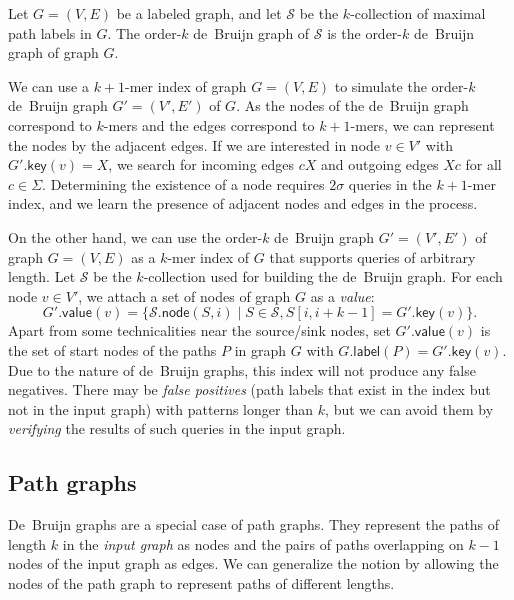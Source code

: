 \documentclass[a4paper,UKenglish]{lipics-v2016}
\newcommand{\set}[1]{\ensuremath{\{ #1 \}}}
\newcommand{\glabel}{\ensuremath{\mathsf{label}}}
\newcommand{\gkey}{\ensuremath{\mathsf{key}}}
\newcommand{\gvalue}{\ensuremath{\mathsf{value}}}
\newcommand{\gnode}{\ensuremath{\mathsf{node}}}
\newcommand{\kmer}[1]{$#1$\nobreakdash-mer}
\newcommand{\kcollection}[1]{$#1$\nobreakdash-collection}
\newcommand{\orderk}[1]{order\nobreakdash-$#1$}
\begin{document}
\begin{definition}
Let $G = (V, E)$ be a labeled graph, and let $\mathcal{S}$ be the \kcollection{k} of maximal path labels in $G$. The \orderk{k} de~Bruijn graph of $\mathcal{S}$ is the \orderk{k} de~Bruijn graph of graph $G$.
\end{definition}

We can use a \kmer{k+1} index of graph $G = (V, E)$ to simulate the \orderk{k} de~Bruijn graph $G' = (V', E')$ of $G$. As the nodes of the de~Bruijn graph correspond to \kmer{k}s and the edges correspond to \kmer{k+1}s, we can represent the nodes by the adjacent edges. If we are interested in node $v \in V'$ with $G'.\gkey(v) = X$, we search for incoming edges $cX$ and outgoing edges $Xc$ for all $c \in \Sigma$. Determining the existence of a node requires $2 \sigma$ queries in the \kmer{k+1} index, and we learn the presence of adjacent nodes and edges in the process.

On the other hand, we can use the \orderk{k} de~Bruijn graph $G' = (V', E')$ of graph $G = (V, E)$ as a \kmer{k} index of $G$ that supports queries of arbitrary length. Let $\mathcal{S}$ be the \kcollection{k} used for building the de~Bruijn graph. For each node $v \in V'$, we attach a set of nodes of graph $G$ as a \emph{value}:
$$
G'.\gvalue(v) = \set{ \mathcal{S}.\gnode(S, i) \mid S \in \mathcal{S}, S[i, i+k-1] = G'.\gkey(v)}.
$$
Apart from some technicalities near the source/sink nodes, set $G'.\gvalue(v)$ is the set of start nodes of the paths $P$ in graph $G$ with $G.\glabel(P) = G'.\gkey(v)$. Due to the nature of de~Bruijn graphs, this index will not produce any false negatives. There may be \emph{false positives} (path labels that exist in the index but not in the input graph) with patterns longer than $k$, but we can avoid them by \emph{verifying} the results of such queries in the input graph.

\subsection{Path graphs}

De~Bruijn graphs are a special case of path graphs. They represent the paths of length $k$ in the \emph{input graph} as nodes and the pairs of paths overlapping on $k-1$ nodes of the input graph as edges. We can generalize the notion by allowing the nodes of the path graph to represent paths of different lengths.
\end{document}
